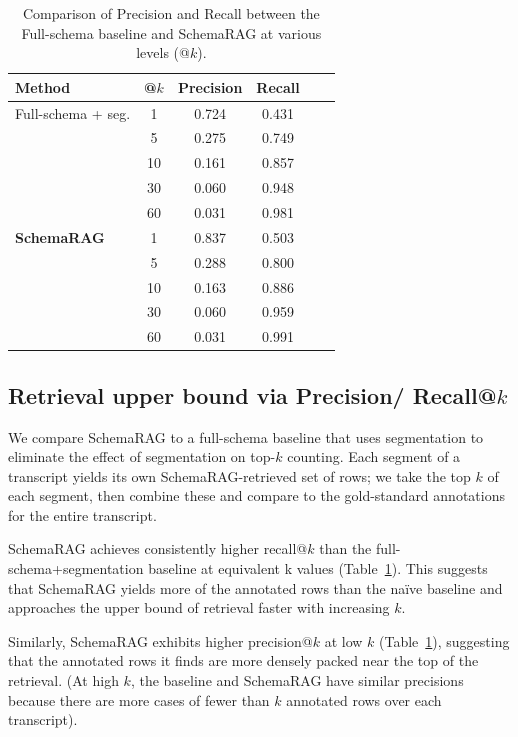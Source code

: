 \begin{table}[t]
    \centering
    \caption{Comparison of Precision and Recall between the Full-schema baseline and SchemaRAG at various levels (@$k$).}
    \label{tab:results_comparison}
    \begin{tabular}{@{}lccccc@{}}
        \toprule
        \textbf{Method} & \textbf{@\boldmath$k$} & \textbf{Precision} & \textbf{Recall} \\ \midrule
        Full-schema + seg. & 1  & 0.724 & 0.431 \\
                                   & 5  & 0.275 & 0.749 \\
                                   & 10 & 0.161 & 0.857 \\
                                   & 30 & 0.060 & 0.948 \\
                                   & 60 & 0.031 & 0.981 \\ 
        \midrule
        \textbf{SchemaRAG}         & 1  & 0.837 & 0.503 \\
                                   & 5  & 0.288 & 0.800 \\
                                   & 10 & 0.163 & 0.886 \\
                                   & 30 & 0.060 & 0.959 \\
                                   & 60 & 0.031 & 0.991 \\
        \bottomrule
    \end{tabular}
\end{table}


\subsection{Retrieval upper bound via Precision/ Recall@\boldmath$k$} 
We compare SchemaRAG to a full-schema baseline that uses segmentation to eliminate the effect of segmentation on top-$k$ counting. Each segment of a transcript yields its own SchemaRAG-retrieved set of rows; we take the top $k$ of each segment, then combine these and compare to the gold-standard annotations for the entire transcript.

SchemaRAG achieves consistently higher recall@$k$ than the full-schema+segmentation baseline at equivalent k values (Table~\ref{tab:results_comparison}). This suggests that SchemaRAG yields more of the annotated rows than the naïve baseline and approaches the upper bound of retrieval faster with increasing $k$.

Similarly, SchemaRAG exhibits higher precision@$k$ at low $k$  (Table~\ref{tab:results_comparison}), suggesting that the annotated rows it finds are more densely packed near the top of the retrieval. (At high $k$, the baseline and SchemaRAG have similar precisions because there are more cases of fewer than $k$ annotated rows over each transcript).

